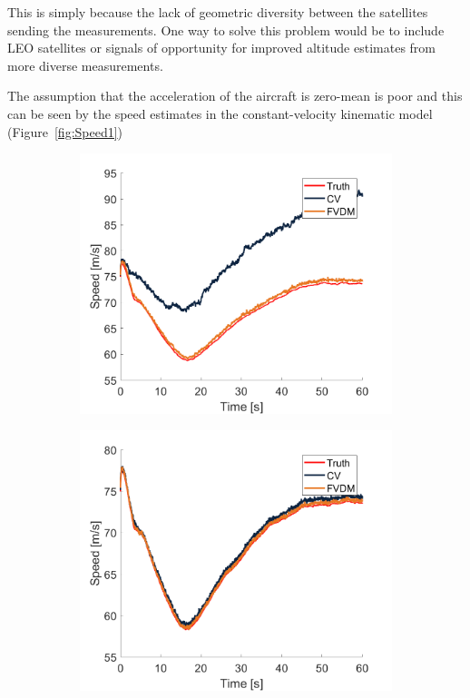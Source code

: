 This is simply because the lack of geometric diversity between the satellites sending the measurements. One way to solve this problem would be to include LEO satellites or signals of opportunity for improved altitude estimates from more diverse measurements.

The assumption that the acceleration of the aircraft is zero-mean is poor and this can be seen by the speed estimates in the constant-velocity kinematic model (Figure~\ref{fig:Speed1})

\begin{figure}[!ht]
    \begin{subfigure}{.45\textwidth}
        \centering
        \includegraphics[width=1\linewidth]{Figures/straight/20/SPEED.png}
    \end{subfigure}
    \begin{subfigure}{.45\textwidth}
        \centering
        \includegraphics[width=1\linewidth]{Figures/straight/25/SPEED.png}

\end{subfigure}
\end{figure}
